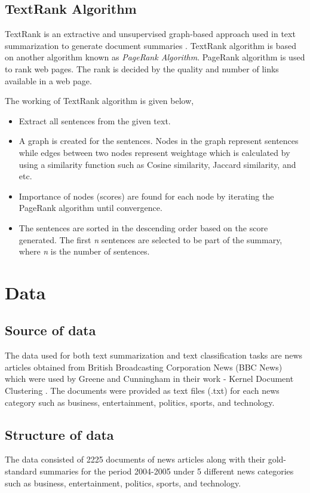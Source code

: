 \documentclass[a4paper,4pt]{article}
\begin{document}
\subsection{TextRank Algorithm}
TextRank is an extractive and unsupervised graph-based approach used in text summarization to generate document summaries \cite{textrank}.
TextRank algorithm is based on another algorithm known as \textit{PageRank Algorithm}. PageRank algorithm is used to rank web pages.
The rank is decided by the quality and number of links available in a web page. \\ \par 
The working of TextRank algorithm is given below,
\begin{itemize}
    \item Extract all sentences from the given text.
    \item A graph is created for the sentences. Nodes in the graph represent sentences while edges between two nodes represent weightage which
    is calculated by using a similarity function such as Cosine similarity, Jaccard similarity, and etc.
    \item Importance of nodes (scores) are found for each node by iterating the PageRank algorithm until convergence.
    \item The sentences are sorted in the descending order based on the score generated. The first \textit{n} sentences are selected
    to be part of the summary, where \textit{n} is the number of sentences.
\end{itemize}

\section{Data}
\subsection{Source of data}
The data used for both text summarization and text classification tasks are news articles obtained from British Broadcasting Corporation News 
(BBC News) which were used by Greene and Cunningham in their work - Kernel Document Clustering \cite{greene06icml}. The documents 
were provided as text files (.txt) for each news category such as business, entertainment, politics, sports, and technology.
\subsection{Structure of data}
The data consisted of 2225 documents of news articles along with their gold-standard summaries for the period 2004-2005 under 5 different news categories such 
as business, entertainment, politics, sports, and technology.
\end{document}

